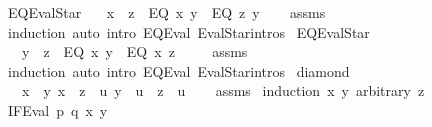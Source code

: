 \begin{isabellebody}
\ EQ{\isacharunderscore}{\kern0pt}EvalStar{}{\isacharcolon}{\kern0pt}\isanewline
\ \ \ {\isachardoublequoteopen}x\ {\isasymRrightarrow}{\isacharasterisk}{\kern0pt}\ z{\isachardoublequoteclose}\ \ {\isachardoublequoteopen}EQ\ x\ y\ {\isasymRrightarrow}{\isacharasterisk}{\kern0pt}\ EQ\ z\ y{\isachardoublequoteclose}\isanewline
%
\isadelimproof
\ \ %
\endisadelimproof
%
\isatagproof
{}\isamarkupfalse%
\ assms\ \isamarkupfalse%
\ induction\ {\isacharparenleft}{\kern0pt}auto\ intro{\isacharcolon}{\kern0pt}\ EQ{\isacharunderscore}{\kern0pt}Eval{}\ EvalStar{\isachardot}{\kern0pt}intros{\isacharparenright}{\kern0pt}%
\endisatagproof
{\isafoldproof}%
%
\isadelimproof
\isanewline
%
\endisadelimproof
\isanewline
{}\isamarkupfalse%
\ EQ{\isacharunderscore}{\kern0pt}EvalStar{}{\isacharcolon}{\kern0pt}\isanewline
\ \ \ {\isachardoublequoteopen}y\ {\isasymRrightarrow}{\isacharasterisk}{\kern0pt}\ z{\isachardoublequoteclose}\ \ {\isachardoublequoteopen}EQ\ x\ y\ {\isasymRrightarrow}{\isacharasterisk}{\kern0pt}\ EQ\ x\ z\ {\isachardoublequoteclose}\isanewline
%
\isadelimproof
\ \ %
\endisadelimproof
%
\isatagproof
{}\isamarkupfalse%
\ assms\ \isamarkupfalse%
\ induction\ {\isacharparenleft}{\kern0pt}auto\ intro{\isacharcolon}{\kern0pt}\ EQ{\isacharunderscore}{\kern0pt}Eval{}\ EvalStar{\isachardot}{\kern0pt}intros{\isacharparenright}{\kern0pt}%
\endisatagproof
{\isafoldproof}%
%
\isadelimproof
\isanewline
%
\endisadelimproof
\isanewline
{}\isamarkupfalse%
\ diamond{\isacharcolon}{\kern0pt}\isanewline
\ \ \ {\isachardoublequoteopen}x\ {\isasymRrightarrow}\ y{\isachardoublequoteclose}\ {\isachardoublequoteopen}x\ {\isasymRrightarrow}\ z{\isachardoublequoteclose}\ \ {\isachardoublequoteopen}{\isasymexists}u{\isachardot}{\kern0pt}\ y\ {\isasymRrightarrow}{\isacharasterisk}{\kern0pt}\ u\ {\isasymand}\ z\ {\isasymRrightarrow}{\isacharasterisk}{\kern0pt}\ u{\isachardoublequoteclose}\isanewline
%
\isadelimproof
\ \ %
\endisadelimproof
%
\isatagproof
{}\isamarkupfalse%
\ assms\isanewline
{}\isamarkupfalse%
\ {\isacharparenleft}{\kern0pt}induction\ x\ y\ arbitrary{\isacharcolon}{\kern0pt}\ z{\isacharparenright}{\kern0pt}\isanewline
\ \ \isamarkupfalse%
\ {\isacharparenleft}{\kern0pt}IF{\isacharunderscore}{\kern0pt}Eval\ p\ q\ x\ y{\isacharparenright}{\kern0pt}\isanewline

\end{isabellebody}
